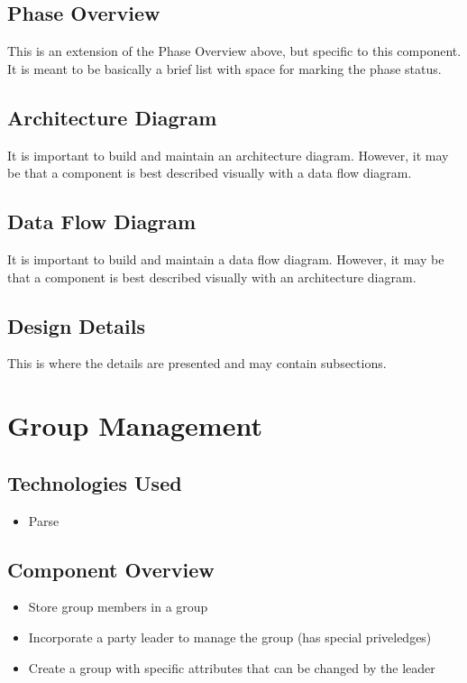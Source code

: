 \subsection{Phase Overview}
This is an extension of the Phase Overview above, but specific to this component. 
 It is meant to be basically a brief list with space for marking the phase status. 

\subsection{ Architecture  Diagram}
It is important to build and maintain an architecture diagram.  However, it may 
be that a component is best described visually with a data flow diagram. 

\subsection{Data Flow Diagram}
It is important to build and maintain a data flow diagram.  However, it may be 
that a component is best described visually with an architecture diagram. 


\subsection{Design Details}
This is where the details are presented and may contain subsections. 

\section{Group Management }

\subsection{Technologies  Used}
\begin{itemize}
  \item Parse
\end{itemize}

\subsection{Component  Overview}
\begin{itemize}
  \item Store group members in a group
  \item Incorporate a party leader to manage the group (has special priveledges)
  \item Create a group with specific attributes that can be changed by the leader
\end{itemize}


